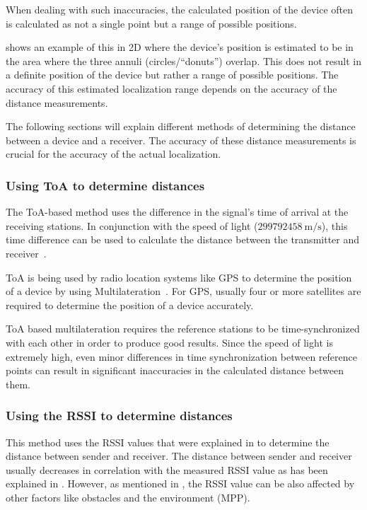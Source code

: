 When dealing with such inaccuracies, the calculated position of the device often is calculated as not a single point but a range of possible positions.

 shows an example of this in 2D where the device's position is estimated to be in the area where the three annuli (circles/``donuts'') overlap.
This does not result in a definite position of the device but rather a range of possible positions.
The accuracy of this estimated localization range depends on the accuracy of the distance measurements.

The following sections will explain different methods of determining the distance between a device and a receiver.
The accuracy of these distance measurements is crucial for the accuracy of the actual localization.

\subsubsection{Using \acl{ToA} to determine distances}\label{sec:toa-based-multilateration}

The \ac{ToA}-based method uses the difference in the signal's time of arrival at the receiving stations.
In conjunction with the speed of light ($299792458\ \mathrm{m/s}$), this time difference can be used to calculate the distance between the transmitter and receiver~\cite{khalaf-allah_time_2015}.

\ac{ToA} is being used by radio location systems like \ac{GPS} to determine the position of a device by using Multilateration~\cite{department_of_defense_usa_gps_2020}.
For GPS, usually four or more satellites are required to determine the position of a device accurately.

\ac{ToA} based multilateration requires the reference stations to be time-synchronized with each other in order to produce good results.
Since the speed of light is extremely high, even minor differences in time synchronization between reference points can result in significant inaccuracies in the calculated distance between them.

\subsubsection{Using the \acl{RSSI} to determine distances}\label{sec:rssi-based-multilateration}

This method uses the \acf{RSSI} values that were explained in  to determine the distance between sender and receiver.
The distance between sender and receiver usually decreases in correlation with the measured \ac{RSSI} value as has been explained in .
However, as mentioned in , the \ac{RSSI} value can be also affected by other factors like obstacles and the environment (\ac{MPP}).

